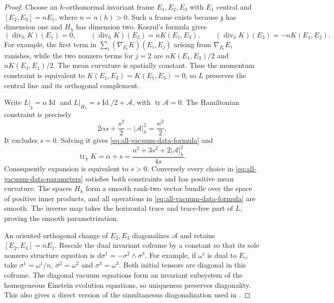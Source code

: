 \documentclass[10pt,a4paper]{article}
\numberwithin{equation}{section}
\theoremstyle{definition}
\theoremstyle{remark}
\newcommand{\dd}{\mathrm d}
\begin{document}
\begin{proof}
Choose an $h$-orthonormal invariant frame $E_1,E_2,E_3$ with $E_1$
central and
$[E_2,E_3]=nE_1$, where $n=n(h)>0$.  Such a frame exists because
$\mathfrak z$ has dimension one and $H_h$ has dimension two.
Koszul's formula gives
\[
 (\operatorname{div}_hK)(E_1)=0,\qquad
 (\operatorname{div}_hK)(E_2)=nK(E_1,E_3),\qquad
 (\operatorname{div}_hK)(E_3)=-nK(E_1,E_2).
\]
For example, the first term in
$\sum_i(\nabla_{E_i}K)(E_i,E_j)$ arising from
$\nabla_{E_i}E_i$ vanishes, while the two nonzero terms for $j=2$
are $nK(E_1,E_3)/2$ and $nK(E_3,E_1)/2$.
The mean curvature is spatially constant.  Thus the momentum constraint
is equivalent to $K(E_1,E_2)=K(E_1,E_3)=0$, so $L$ preserves the
central line and its orthogonal complement.

Write $L|_{\mathfrak z}=\alpha\operatorname{Id}$ and
$L|_{H_h}=s\operatorname{Id}/2+\mathcal A$, with
$\operatorname{tr}\mathcal A=0$.  The Hamiltonian constraint is
precisely
\begin{equation}
 2\alpha s+\frac{s^2}{2}-|\mathcal A|_h^2=\frac{n^2}{2}.
 \label{eq:all-vacuum-reduced-constraint}
\end{equation}
It excludes $s=0$.  Solving it gives
\eqref{eq:all-vacuum-data-formula} and
\begin{equation}
 \operatorname{tr}_hK=\alpha+s
 =\frac{n^2+3s^2+2|\mathcal A|_h^2}{4s}.
 \label{eq:all-vacuum-expansion-sign}
\end{equation}
Consequently expansion is equivalent to $s>0$.  Conversely every
choice in \eqref{eq:all-vacuum-data-parameters} satisfies both
constraints and has positive mean curvature.  The spaces $H_h$ form
a smooth rank-two vector bundle over the space of positive inner
products, and all operations in
\eqref{eq:all-vacuum-data-formula} are smooth.  The inverse map takes
the horizontal trace and trace-free part of $L$, proving the smooth
parametrization.

An oriented orthogonal change of $E_2,E_3$ diagonalizes
$\mathcal A$ and retains $[E_2,E_3]=nE_1$.
Rescale the dual invariant coframe by a constant so that its sole
nonzero structure equation is
$\dd\sigma^1=-\sigma^2\wedge\sigma^3$.
For example, if $\omega^i$ is dual to $E_i$, take
$\sigma^1=\omega^1/n$, $\sigma^2=\omega^2$ and
$\sigma^3=\omega^3$.
Both initial tensors are diagonal in this coframe.  The diagonal
vacuum equations form an invariant subsystem of the homogeneous
Einstein evolution equations, so uniqueness preserves diagonality.
This also gives a direct version of the simultaneous diagonalization
used in \cite[Lemma~2.4]{Ringstrom2025}.


\end{proof}
\end{document}

